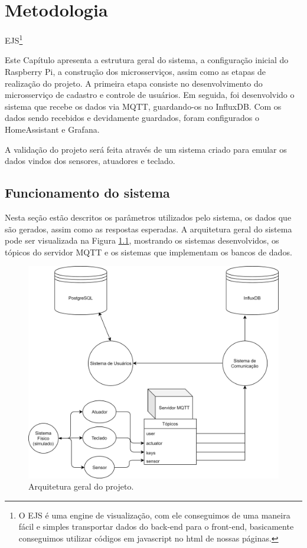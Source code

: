 \chapter{Metodologia}

EJS\footnote{O EJS é uma engine de visualização, com ele conseguimos de uma maneira fácil e simples transportar dados do back-end para o front-end, basicamente conseguimos utilizar códigos em javascript no html de nossas páginas.}

Este Capítulo apresenta a estrutura geral do sistema, a configuração inicial do Raspberry Pi, a construção dos microsserviços, assim como as etapas de realização do projeto. A
primeira etapa consiste no desenvolvimento do microsserviço de cadastro e controle de usuários. Em seguida, foi desenvolvido o sistema que recebe os dados via MQTT, guardando-os no InfluxDB. Com os dados sendo recebidos e devidamente guardados, foram configurados o HomeAssistant e Grafana.

A validação do projeto será feita através de um sistema criado para emular os dados vindos dos sensores, atuadores e teclado.

\section{Funcionamento do sistema} \label{sec:funcionamento}

Nesta seção estão descritos os parâmetros utilizados pelo sistema, os dados que são gerados, assim como as respostas esperadas. A arquitetura geral do sistema pode ser visualizada na Figura \ref{fig:arqgeral}, mostrando os sistemas desenvolvidos, os tópicos do servidor MQTT e os sistemas que implementam os bancos de dados.

\begin{figure}[htbp]
	\centering
	\includegraphics[width=0.7\linewidth]{figuras/ArquiteturaDoProjeto.png}
	\caption{Arquitetura geral do projeto.}
	\label{fig:arqgeral}
\end{figure}

